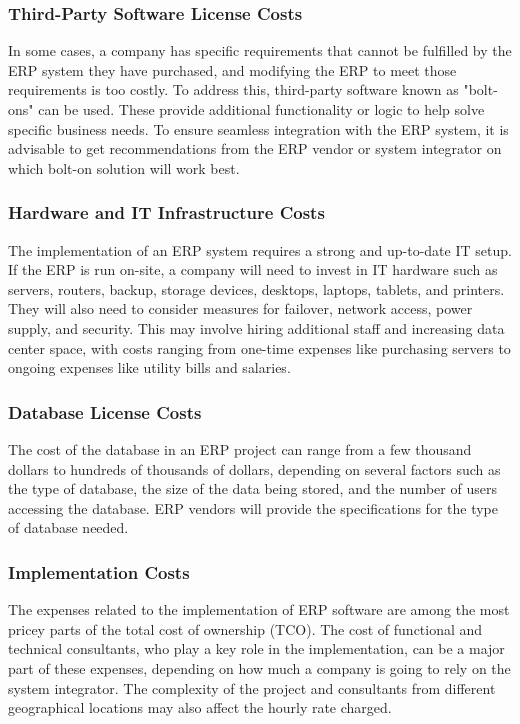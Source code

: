 \subsubsection{Third-Party Software License Costs}
In some cases, a company has specific requirements that cannot be fulfilled by the ERP system they have purchased, and modifying the ERP to meet those requirements is too costly. To address this, third-party software known as "bolt-ons" can be used. These provide additional functionality or logic to help solve specific business needs. To ensure seamless integration with the ERP system, it is advisable to get recommendations from the ERP vendor or system integrator on which bolt-on solution will work best.

\subsubsection{Hardware and IT Infrastructure Costs}
The implementation of an ERP system requires a strong and up-to-date IT setup. If the ERP is run on-site, a company will need to invest in IT hardware such as servers, routers, backup, storage devices, desktops, laptops, tablets, and printers. They will also need to consider measures for failover, network access, power supply, and security. This may involve hiring additional staff and increasing data center space, with costs ranging from one-time expenses like purchasing servers to ongoing expenses like utility bills and salaries.

\subsubsection{Database License Costs}
The cost of the database in an ERP project can range from a few thousand dollars to hundreds of thousands of dollars, depending on several factors such as the type of database, the size of the data being stored, and the number of users accessing the database. ERP vendors will provide the specifications for the type of database needed.

\subsubsection{Implementation Costs}
The expenses related to the implementation of ERP software are among the most pricey parts of the total cost of ownership (TCO). The cost of functional and technical consultants, who play a key role in the implementation, can be a major part of these expenses, depending on how much a company is going to rely on the system integrator.
The complexity of the project and consultants from different geographical locations may also affect the hourly rate charged.

